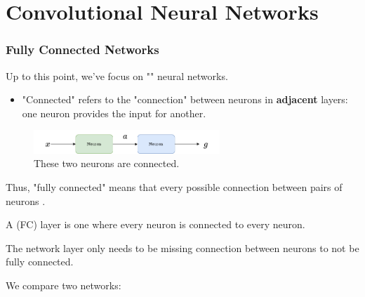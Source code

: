 
\setcounter{chapter}{9-1}

\chapter{Convolutional Neural Networks}

    \subsection{Fully Connected Networks}

        Up to this point, we've focus on "" neural networks. 

        \begin{itemize}
            \item "Connected" refers to the "connection" between neurons in \textbf{adjacent} layers: one neuron provides the input for another.
        \end{itemize}

        \begin{figure}[H]
            \centering
            \includegraphics[width=70mm,scale=0.5]{images/nn_images/series_a.png}
            
            \caption*{These two neurons are connected.}
        \end{figure}

        Thus, "fully connected" means that every possible connection between pairs of neurons .\\
        
        \begin{definition}
            A  (FC) layer is one where every  neuron is connected to every  neuron.

            The network layer only needs to be missing  connection between neurons to not be fully connected.
        \end{definition}

        \miniex We compare two networks:

